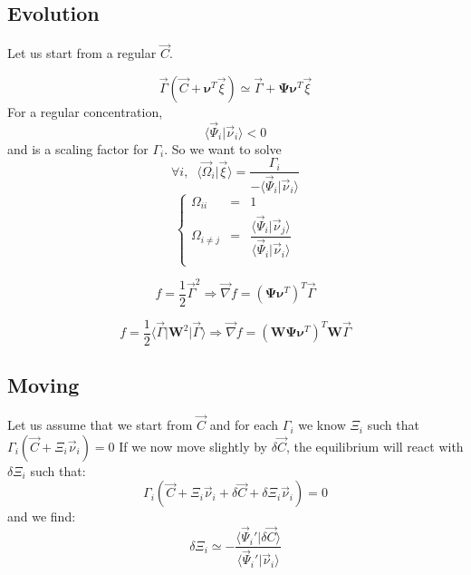 \documentclass[aps,12pt]{revtex4}
\begin{document}
 
\subsection{Evolution}
Let us start from a regular $\vec{C}$.

\begin{equation}
	\vec{\Gamma}(\vec{C}+\bm{\nu}^T \vec{\xi}) \simeq \vec{\Gamma} + \bm{\Psi} \bm{\nu}^T \vec{\xi}
\end{equation}
For a regular concentration,
\begin{equation}
	\langle\vec{\Psi}_i \vert \vec{\nu}_i\rangle < 0
\end{equation}
and is a scaling factor for $\Gamma_i$. So we want to solve
\begin{equation}
	\forall i, \;\; \langle \vec{\Omega}_i \vert \vec{\xi} \rangle = \dfrac{\Gamma_i}{-\langle\vec{\Psi}_i \vert \vec{\nu}_i\rangle}
\end{equation}
\begin{equation}
\left\lbrace
	\begin{array}{rcl}
	\Omega_{ii}   & = & 1\\
	\Omega_{i\not=j} & = & \dfrac{\langle\vec{\Psi}_i \vert \vec{\nu}_j\rangle}{\langle\vec{\Psi}_i \vert \vec{\nu}_i\rangle}\\
	\end{array}
\right.
\end{equation}

\begin{equation}
	f = \dfrac{1}{2} \vec{\Gamma}^2 \Rightarrow \vec{\nabla} f = \left(\bm{\Psi} \bm{\nu}^T\right)^T \vec{\Gamma}
\end{equation}

\begin{equation}
	f = \dfrac{1}{2} \langle \vec{\Gamma} \vert \bm{W}^2 \vert \vec{\Gamma} \rangle \Rightarrow \vec{\nabla} f = \left(\bm{W}\bm{\Psi} \bm{\nu}^T\right)^T \bm{W}\vec{\Gamma}
\end{equation}

\subsection{Moving}

Let us assume that we start from $\vec{C}$ and for each $\Gamma_i$ we know $\Xi_i$ such that $\Gamma_i(\vec{C} + \Xi_i \vec{\nu}_i) =0$
If we now move slightly by $\delta\vec{C}$, the equilibrium will react with $\delta\Xi_i$ such that:
\begin{equation}
	\Gamma_i(\vec{C} + \Xi_i \vec{\nu}_i + \delta\vec{C} + \delta\Xi_i \vec{\nu}_i) = 0
\end{equation}
and we find:
\begin{equation}
	\delta \Xi_i \simeq - \dfrac{\langle \vec{\Psi}_i' \vert \delta\vec{C}\rangle}{\langle \vec{\Psi}_i' \vert \vec{\nu}_i \rangle}
\end{equation}
 
\end{document}
